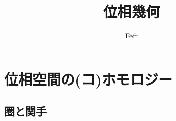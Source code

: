 \documentclass[dvipdfmx,a4paper,11pt]{jsarticle}
\begin{document}
\theoremstyle{plain}
\newtheorem{thm}{Theorem}[section]
\newtheorem{lem}[thm]{Lemma}
\newtheorem{prop}[thm]{Proposition}
\newtheorem{cor}[thm]{Corollary}
\newtheorem{conj}[thm]{Conjecture}

\theoremstyle{definition}
\newtheorem{ass}[thm]{Assumption}
\newtheorem{dfn}[thm]{Definition}

\theoremstyle{remark}
\newtheorem{rem}[thm]{Remark}

\theoremstyle{plain}
\newtheorem*{thm*}{Theorem}
\newtheorem*{lem*}{Lemma}
\newtheorem*{prop*}{Proposition}
\newtheorem*{cor*}{Corollary}
\newtheorem*{conj*}{Conjecture}

\theoremstyle{definition}
\newtheorem*{ass*}{Assumption}
\newtheorem*{dfn*}{Definition}

\theoremstyle{remark}
\newtheorem*{Proof}{Proof}


\theoremstyle{remark}
\newtheorem*{rem*}{Remark}

\title{位相幾何}
\date{}
\author{Fefr}
\maketitle
\tableofcontents
\clearpage


\section{位相空間の(コ)ホモロジー}

\subsection{圏と関手}
\end{document}
